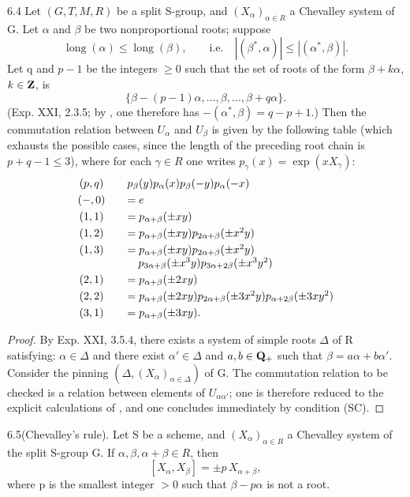 \begin{proposition}{6.4}\label{XXIII.6.4}
Let $(G,T,M,R)$ be a split S-group, and $(X_\alpha)_{\alpha\in R}$ a Chevalley system of G. Let $\alpha$ and $\beta$ be two nonproportional roots; suppose
\[
\operatorname{long}(\alpha)\leq\operatorname{long}(\beta),\qquad\text{i.e.}\quad |(\beta^*,\alpha)|\leq |(\alpha^*,\beta)|.
\]
Let q and $p-1$ be the integers $\geq0$ such that the set of roots of the form $\beta+k\alpha$, $k\in\mathbf{Z}$, is
\[
\{\beta-(p-1)\alpha,\ldots,\beta,\ldots,\beta+q\alpha\}.
\]
(\Cf Exp. XXI, 2.3.5; by \loccit, one therefore has $-(\alpha^*,\beta)=q-p+1$.) Then the commutation relation between $U_\alpha$ and $U_\beta$ is given by the following table (which exhausts the possible cases, since the length of the preceding root chain is $p+q-1\leq3$), where for each $\gamma\in R$ one writes $p_\gamma(x)=\exp(xX_\gamma)$:
\[
\begin{array}{c@{\qquad}l}
(p,q)&p_\beta(y)p_\alpha(x)p_\beta(-y)p_\alpha(-x)\\[.3em]
(-,0)&=e\\[.3em]
(1,1)&=p_{\alpha+\beta}(\pm xy)\\[.3em]
(1,2)&=p_{\alpha+\beta}(\pm xy)p_{2\alpha+\beta}(\pm x^2y)\\[.3em]
(1,3)&=p_{\alpha+\beta}(\pm xy)p_{2\alpha+\beta}(\pm x^2y)\\
&\quad p_{3\alpha+\beta}(\pm x^3y)p_{3\alpha+2\beta}(\pm x^3y^2)\\[.3em]
(2,1)&=p_{\alpha+\beta}(\pm2xy)\\[.3em]
(2,2)&=p_{\alpha+\beta}(\pm2xy)p_{2\alpha+\beta}(\pm3x^2y)p_{\alpha+2\beta}(\pm3xy^2)\\[.3em]
(3,1)&=p_{\alpha+\beta}(\pm3xy).
\end{array}
\]
\end{proposition}
\begin{proof}
By Exp. XXI, 3.5.4, there exists a system of simple roots $\Delta$ of R satisfying: $\alpha\in\Delta$ and there exist $\alpha'\in\Delta$ and $a,b\in\mathbf{Q}_+$ such that $\beta=a\alpha+b\alpha'$. Consider the pinning $(\Delta,(X_\alpha)_{\alpha\in\Delta})$ of G. The commutation relation to be checked is a relation between elements of $U_{\alpha\alpha'}$; one is therefore reduced to the explicit calculations of , and one concludes immediately by condition (SC).
\end{proof}
\begin{corollary}{6.5}\label{XXIII.6.5}\textup{(Chevalley's rule).}
Let S be a scheme, and $(X_\alpha)_{\alpha\in R}$ a Chevalley system of the split S-group G. If $\alpha,\beta,\alpha+\beta\in R$, then
\[
[X_\alpha,X_\beta]=\pm p\,X_{\alpha+\beta},
\]
where p is the smallest integer $>0$ such that $\beta-p\alpha$ is not a root.
\end{corollary}

